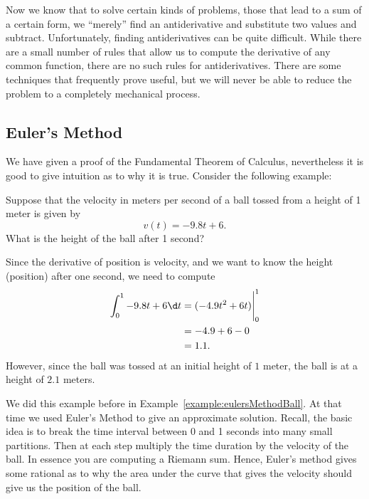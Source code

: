 Now we know that to solve certain kinds of problems, those that lead
to a sum of a certain form, we ``merely'' find an antiderivative and
substitute two values and subtract. Unfortunately, finding
antiderivatives can be quite difficult. While there are a small number
of rules that allow us to compute the derivative of any common
function, there are no such rules for antiderivatives. There are some
techniques that frequently prove useful, but we will never be able to
reduce the problem to a completely mechanical process.






\subsection*{Euler's Method}

We have given a proof of the Fundamental Theorem of Calculus,
nevertheless it is good to give intuition as to why it is
true. Consider the following example:

\begin{example}
Suppose that the velocity in meters per second of a ball tossed from a
height of 1 meter is given by
\[
v(t) = -9.8t + 6.
\]
What is the height of the ball after 1 second?
\end{example}

\begin{solution}
Since the derivative of position is velocity, and we want to know the
height (position) after one second, we need to compute
\begin{align*}
\int_0^1 -9.8t + 6 \d t &= (-4.9t^2 + 6t)\Bigg|_0^1\\
&= -4.9 + 6 - 0\\
&= 1.1.
\end{align*}
However, since the ball was tossed at an initial height of $1$ meter,
the ball is at a height of $2.1$ meters.
\end{solution}

We did this example before in
Example~\ref{example:eulersMethodBall}. At that time we used Euler's
Method to give an approximate solution. Recall, the basic idea is to
break the time interval between 0 and 1 seconds into many small
partitions. Then at each step multiply the time duration by the
velocity of the ball. In essence you are computing a Riemann
sum. Hence, Euler's method gives some rational as to why the area
under the curve that gives the velocity should give us the position of
the ball.

